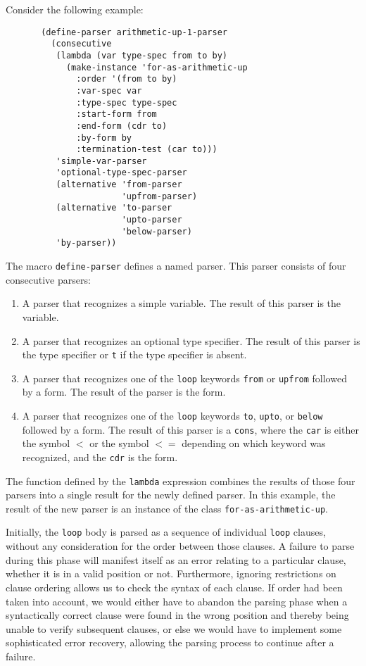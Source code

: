 Consider the following example:

{\small\begin{verbatim}
       (define-parser arithmetic-up-1-parser
         (consecutive
          (lambda (var type-spec from to by)
            (make-instance 'for-as-arithmetic-up
              :order '(from to by)
              :var-spec var
              :type-spec type-spec
              :start-form from
              :end-form (cdr to)
              :by-form by
              :termination-test (car to)))
          'simple-var-parser
          'optional-type-spec-parser
          (alternative 'from-parser
                       'upfrom-parser)
          (alternative 'to-parser
                       'upto-parser
                       'below-parser)
          'by-parser))
\end{verbatim}}

\noindent
The macro \texttt{define-parser} defines a named parser.  This parser
consists of four consecutive parsers:

\begin{enumerate}
\item A parser that recognizes a simple variable.  The result of this
  parser is the variable.
\item A parser that recognizes an optional type specifier.  The
  result of this parser is the type specifier or \texttt{t} if the
  type specifier is absent.
\item A parser that recognizes one of the \texttt{loop} keywords
  \texttt{from} or \texttt{upfrom} followed by a form.  The result of
  the parser is the form.
\item A parser that recognizes one of the \texttt{loop} keywords
  \texttt{to}, \texttt{upto}, or \texttt{below} followed by a form.
  The result of this parser is a \texttt{cons}, where the \texttt{car}
  is either the symbol \texttt{$<$} or the symbol \texttt{$<=$}
  depending on which keyword was recognized, and the \texttt{cdr} is
  the form.
\end{enumerate}

The function defined by the \texttt{lambda} expression combines the
results of those four parsers into a single result for the
newly defined parser.  In this example, the result of the new parser
is an instance of the class \texttt{for-as-arithmetic-up}.

Initially, the \texttt{loop} body is parsed as a sequence of
individual \texttt{loop} clauses, without any consideration for the
order between those clauses.  A failure to parse during this phase
will manifest itself as an error relating to a particular clause,
whether it is in a valid position or not.  Furthermore, ignoring
restrictions on clause ordering allows us to check the syntax of each
clause.  If order had been taken into account, we would either have to
abandon the parsing phase when a syntactically correct clause were
found in the wrong position and thereby being unable to verify
subsequent clauses, or else we would have to implement some
sophisticated error recovery, allowing the parsing process to continue
after a failure.

